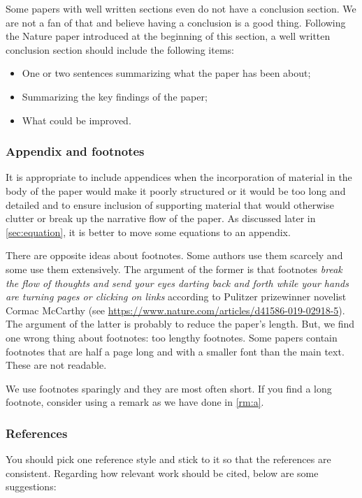 \documentclass[authoryear,3p,times,preprint,review,fleqn]{elsarticle}
\numberwithin{equation}{section}
\theoremstyle{remark}
\begin{document}
Some papers with well written sections even do not have a conclusion section. We are not a fan of that and believe having a conclusion is a good thing. Following the Nature paper introduced at the beginning of this section, a well written conclusion section should include the following items:

\begin{itemize}
\item One or two sentences summarizing what the paper has been about;
\item Summarizing the key findings of the paper;
\item What could be improved.
\end{itemize}

\subsubsection{Appendix and footnotes}\label{sec:appendix-footnotes}

It is appropriate to include appendices when
the incorporation of material in the body of the paper would make it poorly structured or it would be too long and detailed and to ensure inclusion of supporting material that would otherwise clutter or break up the narrative flow of the paper.
As discussed later in \cref{sec:equation}, it is better to move some equations to an appendix.

There are opposite ideas about footnotes. Some authors use them scarcely and some use them extensively. The argument of the former is that footnotes \textit{break the flow of thoughts and send your eyes darting back and forth while your hands are turning pages or clicking on links} according to Pulitzer prizewinner novelist Cormac McCarthy (see \url{https://www.nature.com/articles/d41586-019-02918-5}). The argument of the latter is probably to reduce the paper's length. But, we find one wrong thing about footnotes: too lengthy footnotes. Some papers contain footnotes that are half a page long and with a smaller font than the main text. These are not readable.

We use footnotes sparingly and they are most often short. If you find a long footnote, consider using a remark as we have done in \cref{rm:a}.

\subsubsection{References}\label{sec:references}

You should pick one reference style and stick to it so that the references are consistent. Regarding how relevant work should be cited, below are some suggestions:
\end{document}
